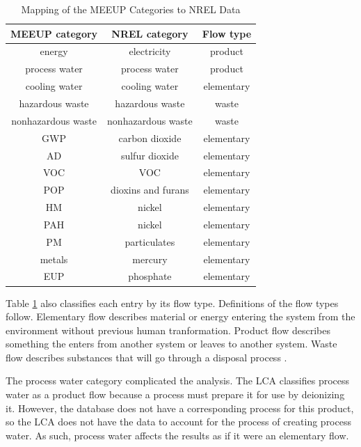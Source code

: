\documentclass[final,journal,10pt,letterpaper,oneside,twocolumn,compsoc]%
{IEEEtran}
\begin{document}
\begin{table}[t!]
\caption{Mapping of the MEEUP Categories to NREL Data}
\centering
\begin{tabular}{|c|c||c|}
  \hline
  MEEUP category      & NREL category       & Flow type \\
  \hline
  energy              & electricity         & product \\
  process water       & process water       & product \\
  cooling water       & cooling water       & elementary \\
  hazardous waste     & hazardous waste     & waste \\
  nonhazardous waste & nonhazardous waste & waste \\
  GWP                 & carbon dioxide      & elementary \\
  AD                  & sulfur dioxide      & elementary \\
  VOC                 & VOC                 & elementary \\
  POP                 & dioxins and furans  & elementary \\
  HM                  & nickel              & elementary \\
  PAH                 & nickel              & elementary \\
  PM                  & particulates        & elementary \\
  metals              & mercury             & elementary \\
  EUP                 & phosphate           & elementary \\
  \hline
\end{tabular}
\label{tab:2}
\end{table}


Table \ref{tab:2} also classifies each entry by its flow type. Definitions of
the flow types follow. Elementary flow describes material or energy entering
the system from the environment without previous human tranformation. Product
flow describes something the enters from another system or leaves to another
system. Waste flow describes substances that will go through a disposal process
\cite{14044}.

The process water category complicated the analysis. The LCA classifies process
water as a product flow because a process must prepare it for use by deionizing
it. However, the database does not have a corresponding process for this
product, so the LCA does not have the data to account for the process of
creating process water. As such, process water affects the results as if it were
an elementary flow.
\end{document}
